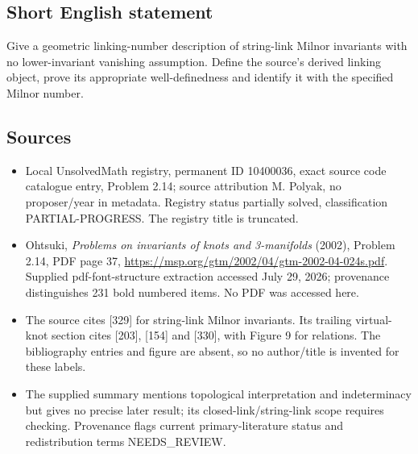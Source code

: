 \documentclass[11pt]{article}
\begin{document}
\subsection{Short English statement}
Give a geometric linking-number description of string-link Milnor invariants with no lower-invariant vanishing assumption. Define the source's derived linking object, prove its appropriate well-definedness and identify it with the specified Milnor number.
\subsection{Sources}
\begin{itemize}
\item Local UnsolvedMath registry, permanent ID 10400036, exact source code catalogue entry, Problem 2.14; source attribution M. Polyak, no proposer/year in metadata. Registry status partially solved, classification PARTIAL-PROGRESS. The registry title is truncated.
\item Ohtsuki, \emph{Problems on invariants of knots and 3-manifolds} (2002), Problem 2.14, PDF page 37, \url{https://msp.org/gtm/2002/04/gtm-2002-04-024s.pdf}. Supplied pdf-font-structure extraction accessed July 29, 2026; provenance distinguishes 231 bold numbered items. No PDF was accessed here.
\item The source cites [329] for string-link Milnor invariants. Its trailing virtual-knot section cites [203], [154] and [330], with Figure 9 for relations. The bibliography entries and figure are absent, so no author/title is invented for these labels.
\item The supplied summary mentions topological interpretation and indeterminacy but gives no precise later result; its closed-link/string-link scope requires checking. Provenance flags current primary-literature status and redistribution terms NEEDS\_REVIEW.
\end{itemize}
\end{document}
